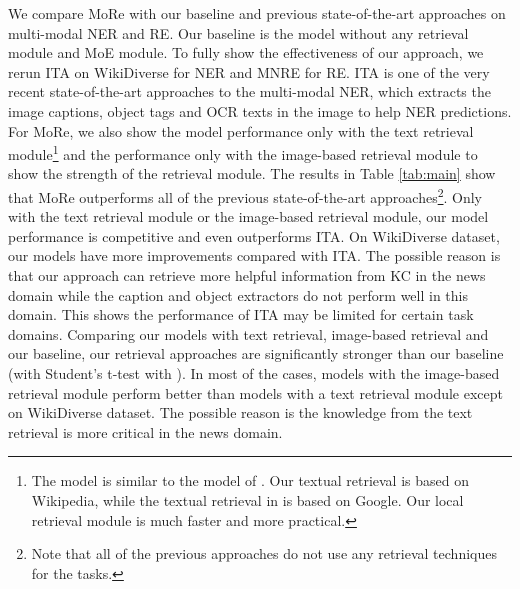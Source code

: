 \documentclass[11pt]{article}
\begin{document}
We compare MoRe with our baseline and previous state-of-the-art approaches on multi-modal NER and RE. Our baseline is the model without any retrieval module and MoE module. To fully show the effectiveness of our approach, we rerun ITA on WikiDiverse for NER and MNRE for RE. ITA is one of the very recent state-of-the-art approaches to the multi-modal NER, which extracts the image captions, object tags and OCR texts in the image to help NER predictions. For MoRe, we also show the model performance only with the text retrieval module\footnote{
The model is similar to the model of \citet{wang-etal-2021-improving}. Our textual retrieval is based on Wikipedia, while the textual retrieval in \citet{wang-etal-2021-improving} is based on Google. Our local retrieval module is much faster and more practical.} and the performance only with the image-based retrieval module to show the strength of the retrieval module. The results in Table \ref{tab:main} show that MoRe outperforms all of the previous state-of-the-art approaches\footnote{Note that all of the previous approaches do not use any retrieval techniques for the tasks.}. Only with the text retrieval module or the image-based retrieval module, our model performance is competitive and even outperforms ITA. On WikiDiverse dataset, our models have more improvements compared with ITA. The possible reason is that our approach can retrieve more helpful information from KC in the news domain while the caption and object extractors do not perform well in this domain. This shows the performance of ITA may be limited for certain task domains. Comparing our models with text retrieval, image-based retrieval and our baseline, our retrieval approaches are significantly stronger than our baseline (with Student's t-test with ). In most of the cases, models with the image-based retrieval module perform better than models with a text retrieval module except on WikiDiverse dataset. The possible reason is the knowledge from the text retrieval is more critical in the news domain.
\end{document}
